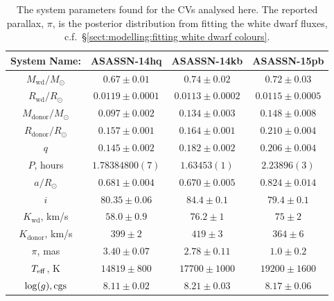 \newpage

\begin{table}
    \centering
    \caption{The system parameters found for the CVs analysed here. The reported parallax, $\pi$, is the posterior distribution from fitting the white dwarf fluxes, c.f.~\S\ref{sect:modelling:fitting white dwarf colours}.}
    \label{table:12 new cvs:system_parameters}
    \begin{tabular}{cccc}
        \hline
        \textbf{System Name:}      & \textbf{ASASSN-14hq}    & \textbf{ASASSN-14kb}     & \textbf{ASASSN-15pb}  \\
        \hline
        \hline
        $M_\mathrm{wd}/M_\odot$    & $0.67\pm0.01$           & $0.74\pm0.02$            & $0.72\pm0.03$         \\
        $R_\mathrm{wd}/R_\odot$    & $0.0119\pm0.0001$       & $0.0113\pm0.0002$        & $0.0115\pm0.0005$     \\
        $M_\mathrm{donor}/M_\odot$ & $0.097\pm0.002$         & $0.134\pm0.003$          & $0.148\pm0.008$       \\
        $R_\mathrm{donor}/R_\odot$ & $0.157\pm0.001$         & $0.164\pm0.001$          & $0.210\pm0.004$       \\
        $q$                        & $0.145\pm0.002$         & $0.182\pm0.002$          & $0.206\pm0.004$       \\
        \hline
        $P$, hours                 & $1.78384800(7)$         & $1.63453(1)$             & $2.23896(3)$          \\
        $a/R_\odot$                & $0.681\pm0.004$         & $0.670\pm0.005$          & $0.824\pm0.014$       \\
        $i$                        & $80.35\pm0.06$          & $84.4\pm0.1$             & $79.4\pm0.1$          \\
        $K_\mathrm{wd}$, km/s      & $58.0\pm0.9$            & $76.2\pm1$               & $75\pm2$              \\
        $K_\mathrm{donor}$, km/s   & $399\pm2$               & $419\pm3$                & $364\pm6$             \\
        \hline
        $\pi$, mas                 & $3.40\pm0.07$           & $2.78\pm0.11$            & $1.0\pm0.2$           \\
        $T_{\rm eff}$, K           & $14819\pm800$           & $17700\pm1000$           & $19200\pm1600$        \\
        $\log(g), {\rm cgs}$       & $8.11\pm0.02$           & $8.21\pm0.03$            & $8.17\pm0.06$         \\

\end{tabular}
\end{table}
